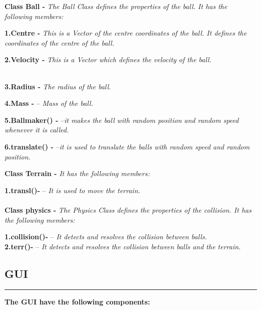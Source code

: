 \documentclass{article}
\begin{document}
\textbf{Class Ball -} \textit{The Ball Class defines the properties of the ball. It has the following members:\\}

\textbf{ 1.Centre -} \textit{This is a Vector of the centre coordinates of the ball. It
defines the coordinates of the centre of the ball.\\} 

\textbf{2.Velocity -}\textit{ This is a Vector which defines the velocity of the ball.\\} \

\textbf{3.Radius -}  \textit{ The radius of the ball.\\}

\textbf{4.Mass -}  – \textit{Mass of the ball.\\}

\textbf{5.Ballmaker() -} –\textit{it makes the ball with random position and random speed whenever it is called.\\}

\textbf{6.translate() -} –\textit{it is used to translate the balls with random speed and random position.\\}

\newpage


\textbf{Class Terrain -} \textit{ It has the following members:\\}

\textbf{1.transl()-}  – \textit{It is used to move the terrain.\\}
\\

\textbf{Class physics -} \textit{The Physics Class defines the properties of the collision. It has the following members:\\}

\textbf{1.collision()-}  – \textit{It detects and resolves the collision between balls.\\}
\textbf{2.terr()-}  – \textit{It detects and resolves the collision between balls and the terrain.\\}
\begin{huge}
\section{GUI}
\noindent
{\color{red} \rule{\linewidth}{0.2mm} }
\end{huge}

\textbf{The GUI have the following components:\\}
\end{document}
